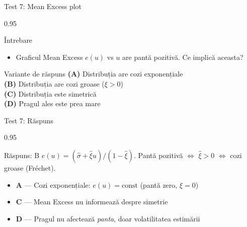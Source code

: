 \documentclass[9pt, aspectratio=169, t]{beamer}
\begin{document}
\begin{frame}{Test 7: Mean Excess plot}
\begin{cminipage}{0.95\textwidth}
    \begin{alertblock}{Întrebare}
        \begin{itemize}\setlength{\itemsep}{0pt}
            \item Graficul Mean Excess $e(u)$ vs $u$ are pantă pozitivă. Ce implică aceasta?
        \end{itemize}
    \end{alertblock}

    \vspace{0.3cm}

    \begin{block}{Variante de răspuns}
        \textcolor{MainBlue}{\textbf{(A)}} Distribuția are cozi exponențiale\\[3pt]
        \textcolor{MainBlue}{\textbf{(B)}} Distribuția are cozi groase ($\xi > 0$)\\[3pt]
        \textcolor{MainBlue}{\textbf{(C)}} Distribuția este simetrică\\[3pt]
        \textcolor{MainBlue}{\textbf{(D)}} Pragul ales este prea mare
    \end{block}
\end{cminipage}
\end{frame}

\begin{frame}{Test 7: Răspuns}
\begin{cminipage}{0.95\textwidth}
    \begin{exampleblock}{Răspuns: B}
        $e(u) = (\hat{\sigma} + \hat{\xi}u)/(1 - \hat{\xi})$. Pantă pozitivă $\Leftrightarrow$ $\hat{\xi} > 0$ $\Leftrightarrow$ cozi groase (Fréchet).
    \end{exampleblock}

    \vspace{0.2cm}

    \begin{itemize}\setlength{\itemsep}{0pt}
        \item \textbf{A} --- Cozi exponențiale: $e(u) = \text{const}$ (pantă zero, $\xi = 0$) \incorrect
        \item \textbf{C} --- Mean Excess nu informează despre simetrie \incorrect
        \item \textbf{D} --- Pragul nu afectează \textit{panta}, doar volatilitatea estimării \incorrect
    \end{itemize}
\end{cminipage}
\end{frame}
\end{document}
